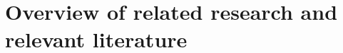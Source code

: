 \documentclass{article}
\theoremstyle{mytheoremstyle}
\theoremstyle{mytheoremstyle}
\theoremstyle{myproblemstyle}
\begin{document}
\section{Overview of related research and relevant literature}
\end{document}
